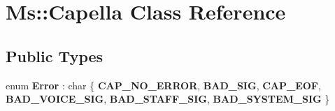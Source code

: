 \hypertarget{class_ms_1_1_capella}{}\section{Ms\+:\+:Capella Class Reference}
\label{class_ms_1_1_capella}
\subsection*{Public Types}
\begin{DoxyCompactItemize}
\item 
\mbox{\label{class_ms_1_1_capella_aa7b29fa3edf0b7e343d0f145e17631f6}} 
enum {\bfseries Error} \+: char \{ \newline
{\bfseries C\+A\+P\+\_\+\+N\+O\+\_\+\+E\+R\+R\+OR}, 
{\bfseries B\+A\+D\+\_\+\+S\+IG}, 
{\bfseries C\+A\+P\+\_\+\+E\+OF}, 
{\bfseries B\+A\+D\+\_\+\+V\+O\+I\+C\+E\+\_\+\+S\+IG}, 
\newline
{\bfseries B\+A\+D\+\_\+\+S\+T\+A\+F\+F\+\_\+\+S\+IG}, 
{\bfseries B\+A\+D\+\_\+\+S\+Y\+S\+T\+E\+M\+\_\+\+S\+IG}
 \}
\end{DoxyCompactItemize}
